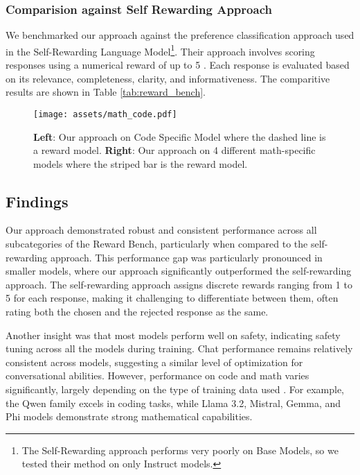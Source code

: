 \subsubsection{Comparision against Self Rewarding Approach}
We benchmarked our approach against the preference classification approach used in the Self-Rewarding Language Model\footnote{The Self-Rewarding approach performs very poorly on Base Models, so we tested their method on only Instruct models.}. Their approach involves scoring responses using a numerical reward of up to 5 \citep{yuan2024selfrewarding,li2024selfalignment}. Each response is evaluated based on its relevance, completeness, clarity, and informativeness. The comparitive results are shown in Table \ref{tab:reward_bench}.
\begin{figure*}[h]
    \centering
    \texttt{[image: assets/math\_code.pdf]}
    \caption{\textbf{Left}: Our approach on Code Specific Model where the dashed line is a reward model. \textbf{Right}: Our approach on 4 different math-specific models where the striped bar is the reward model.}
    \label{Code results}
\end{figure*}
\subsection{Findings}
Our approach demonstrated robust and consistent performance across all subcategories of the Reward Bench, particularly when compared to the self-rewarding approach. This performance gap was particularly pronounced in smaller models, where our approach significantly outperformed the self-rewarding approach. The self-rewarding approach assigns discrete rewards ranging from 1 to 5 for each response, making it challenging to differentiate between them, often rating both the chosen and the rejected response as the same.

Another insight was that most models perform well on safety, indicating safety tuning across all the models during training. Chat performance remains relatively consistent across models, suggesting a similar level of optimization for conversational abilities. However, performance on code and math varies significantly, largely depending on the type of training data used \citep{gunasekar2023textbooks,petty2024does,aryabumi2024code}. For example, the Qwen family excels in coding tasks, while Llama 3.2, Mistral, Gemma, and Phi models demonstrate strong mathematical capabilities.

